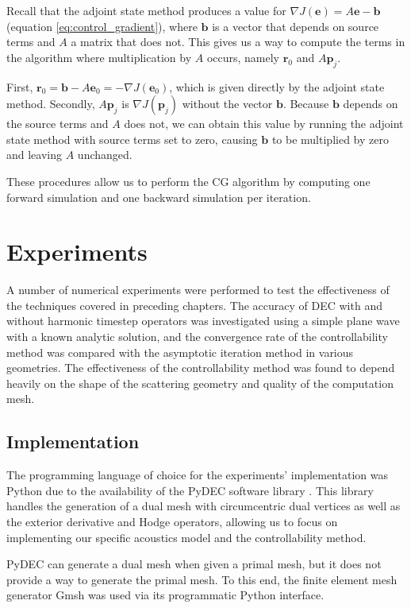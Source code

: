 \documentclass[utf8,english]{gradu3}
\begin{document}
Recall that the adjoint state method produces a value for
$\nabla J(\mathbf{e}) = A\mathbf{e} - \mathbf{b}$ (equation \ref{eq:control_gradient}),
where $\mathbf{b}$ is a vector that depends on source terms and $A$
a matrix that does not.
This gives us a way to compute the terms in the algorithm
where multiplication by $A$ occurs,
namely $\mathbf{r}_0$ and $A\mathbf{p}_j$.

First, $\mathbf{r}_0 = \mathbf{b} - A\mathbf{e}_0 = -\nabla J(\mathbf{e}_0)$,
which is given directly by the adjoint state method.
Secondly, $A\mathbf{p}_j$ is $\nabla J(\mathbf{p}_j)$ without the vector $\mathbf{b}$.
Because $\mathbf{b}$ depends on the source terms and $A$ does not,
we can obtain this value by running the adjoint state method
with source terms set to zero, causing $\mathbf{b}$ to be multiplied by zero
and leaving $A$ unchanged.

These procedures allow us to perform the CG algorithm
by computing one forward simulation and one backward simulation per iteration.


\chapter{Experiments}\label{cha:experiments}

A number of numerical experiments were performed
to test the effectiveness of the techniques
covered in preceding chapters.
The accuracy of DEC with and without harmonic timestep operators
was investigated using a simple plane wave with a known analytic solution,
and the convergence rate of the controllability method was compared
with the asymptotic iteration method in various geometries.
The effectiveness of the controllability method was found to depend heavily
on the shape of the scattering geometry and quality of the computation mesh.


\section{Implementation}

The programming language of choice for the experiments' implementation
was Python due to the availability
of the PyDEC software library \parencite{bell_pydec_2012}.
This library handles the generation of a dual mesh
with circumcentric dual vertices
as well as the exterior derivative and Hodge operators,
allowing us to focus on implementing our specific acoustics model
and the controllability method.

PyDEC can generate a dual mesh when given a primal mesh,
but it does not provide a way to generate the primal mesh.
To this end, the finite element mesh generator Gmsh \parencite{geuzaine_gmsh_2009}
was used via its programmatic Python interface.
\end{document}
